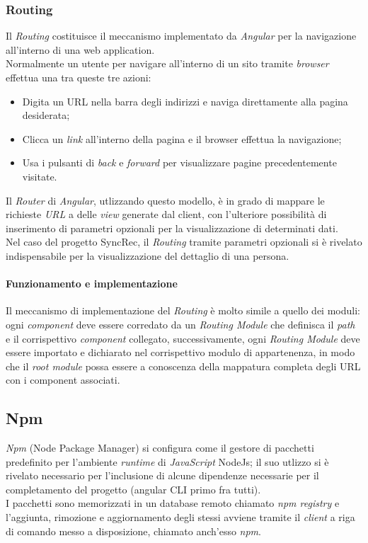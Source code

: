 \subsubsection{Routing}\label{routing}
Il \textit{Routing} costituisce il meccanismo implementato da \textit{Angular} per la navigazione all'interno di una \gls{web application}.\\
Normalmente un utente per navigare all'interno di un sito tramite \textit{browser} effettua una tra queste tre azioni:
\begin{itemize}
	\item Digita un URL nella barra degli indirizzi e naviga direttamente alla pagina desiderata;
	\item Clicca un \textit{link} all'interno della pagina e il browser effettua la navigazione;
	\item Usa i pulsanti di \textit{back} e \textit{forward} per visualizzare pagine precedentemente visitate.
\end{itemize}
Il \textit{Router} di \textit{Angular}, utlizzando questo modello, è in grado di mappare le richieste \textit{URL} a delle \textit{view} generate dal client, con l'ulteriore possibilità di inserimento di parametri opzionali per la visualizzazione di determinati dati.\\
Nel caso del progetto SyncRec, il \textit{Routing} tramite parametri opzionali si è rivelato indispensabile per la visualizzazione del dettaglio di una persona.
\paragraph*{Funzionamento e implementazione}
Il meccanismo di implementazione del \textit{Routing} è molto simile a quello dei moduli: ogni \textit{component} deve essere corredato da un \textit{Routing Module} che definisca il \textit{path} e il corrispettivo \textit{component} collegato, successivamente, ogni \textit{Routing Module} deve essere importato e dichiarato nel corrispettivo modulo di appartenenza, in modo che il \textit{root module} possa essere a conoscenza della mappatura completa degli \gls{URL} con i component associati.

\subsection{Npm}
\textit{Npm} (Node Package Manager) si configura come il gestore di pacchetti predefinito per l'ambiente \textit{runtime} di \textit{JavaScript} \gls{NodeJs}; il suo utlizzo si è rivelato necessario per l'inclusione di alcune dipendenze necessarie per il completamento del progetto (\gls{angular CLI} primo fra tutti).\\
I pacchetti sono memorizzati in un database remoto chiamato \textit{npm registry} e l'aggiunta, rimozione e aggiornamento degli stessi avviene tramite il \textit{client} a riga di comando messo a disposizione, chiamato anch'esso \textit{npm}.

